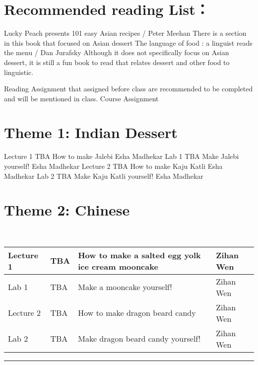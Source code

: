 \documentclass{article}
\begin{document}
\section*{Recommended reading List：}
Lucky Peach presents 101 easy Asian recipes / Peter Meehan 
There is a section in this book that focused on Asian dessert
The language of food : a linguist reads the menu / Dan Jurafsky
Although it does not specifically focus on Asian dessert, it is still a fun book to read that relates dessert and other food to linguistic.

Reading Assignment that assigned before class are recommended to be completed and will be mentioned in class.
Course Assignment

\section*{Theme 1: Indian Dessert}

Lecture 1
TBA
How to make Jalebi 
Esha Madhekar
Lab 1 
TBA
Make Jalebi yourself!
Esha Madhekar
Lecture 2 
TBA
How to make Kaju Katli
Esha Madhekar
Lab 2 
TBA
Make Kaju Katli yourself!
Esha Madhekar

 \section*{Theme 2: Chinese }\\
 \vspace{0.5em} \begin{tabular}{|l|l|l|l|}
\hline 
Lecture 1 & TBA & How to make a salted egg yolk ice cream mooncake & Zihan Wen\\
\hline
Lab 1 & TBA & Make a mooncake yourself!& Zihan Wen\\
\hline
Lecture 2 & TBA & How to make dragon beard candy & Zihan Wen\\
\hline 
Lab 2 & TBA & Make dragon beard candy yourself!& Zihan Wen\\
\hline
\end{tabular}


 \vspace{0.5em}
  \par\noindent\rule{\textwidth}{0.4pt}
  
\end{document}
